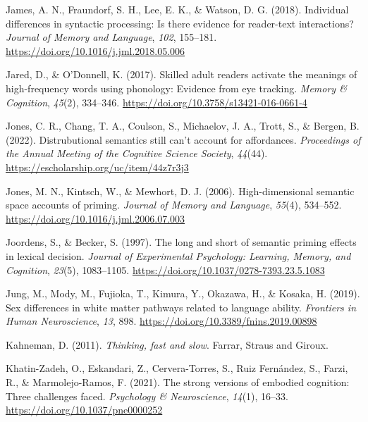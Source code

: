 \documentclass[
  12pt,
  man,floatsintext]{apa7}
\newlength{\cslhangindent}
\newlength{\cslentryspacingunit} %
\newenvironment{CSLReferences}[2] %
 {%
  \setlength{\parindent}{0pt}
  \ifodd #1
  \let\oldpar\par
  \def\par{\hangindent=\cslhangindent\oldpar}
  \fi
  \setlength{\parskip}{#2\cslentryspacingunit}
 }%
 {}
\begin{document}
\begin{CSLReferences}{1}{0}
\leavevmode{}%
James, A. N., Fraundorf, S. H., Lee, E. K., \& Watson, D. G. (2018). Individual differences in syntactic processing: {Is} there evidence for reader-text interactions? \emph{Journal of Memory and Language}, \emph{102}, 155--181. \url{https://doi.org/10.1016/j.jml.2018.05.006}

\leavevmode{}%
Jared, D., \& O'Donnell, K. (2017). Skilled adult readers activate the meanings of high-frequency words using phonology: {Evidence} from eye tracking. \emph{Memory \& Cognition}, \emph{45}(2), 334--346. \url{https://doi.org/10.3758/s13421-016-0661-4}

\leavevmode{}%
Jones, C. R., Chang, T. A., Coulson, S., Michaelov, J. A., Trott, S., \& Bergen, B. (2022). Distrubutional semantics still can't account for affordances. \emph{Proceedings of the Annual Meeting of the Cognitive Science Society}, \emph{44}(44). \url{https://escholarship.org/uc/item/44z7r3j3}

\leavevmode{}%
Jones, M. N., Kintsch, W., \& Mewhort, D. J. (2006). High-dimensional semantic space accounts of priming. \emph{Journal of Memory and Language}, \emph{55}(4), 534--552. \url{https://doi.org/10.1016/j.jml.2006.07.003}

\leavevmode{}%
Joordens, S., \& Becker, S. (1997). The long and short of semantic priming effects in lexical decision. \emph{Journal of Experimental Psychology: Learning, Memory, and Cognition}, \emph{23}(5), 1083--1105. \url{https://doi.org/10.1037/0278-7393.23.5.1083}

\leavevmode{}%
Jung, M., Mody, M., Fujioka, T., Kimura, Y., Okazawa, H., \& Kosaka, H. (2019). Sex differences in white matter pathways related to language ability. \emph{Frontiers in Human Neuroscience}, \emph{13}, 898. \url{https://doi.org/10.3389/fnins.2019.00898}

\leavevmode{}%
Kahneman, D. (2011). \emph{Thinking, fast and slow}. {Farrar, Straus and Giroux}.

\leavevmode{}%
Khatin-Zadeh, O., Eskandari, Z., Cervera-Torres, S., Ruiz Fernández, S., Farzi, R., \& Marmolejo-Ramos, F. (2021). The strong versions of embodied cognition: {Three} challenges faced. \emph{Psychology \& Neuroscience}, \emph{14}(1), 16--33. \url{https://doi.org/10.1037/pne0000252}


\end{CSLReferences}
\end{document}
